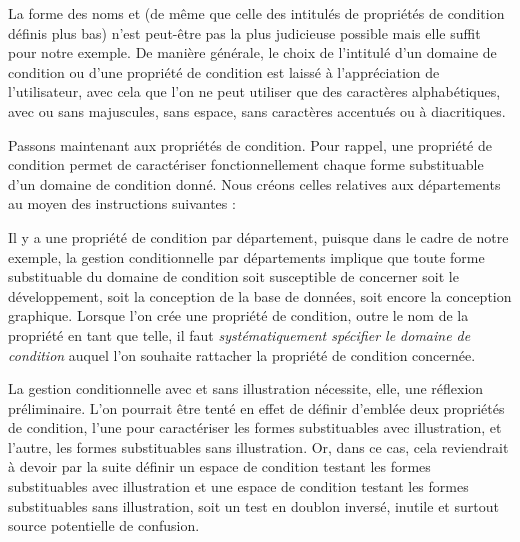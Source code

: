 \documentclass{article}
\begin{document}
\begin{codeblock}
\end{codeblock}

La forme des noms  et  (de même que celle des intitulés de propriétés de condition définis plus bas) n'est peut-être pas la plus judicieuse possible mais elle suffit pour notre exemple. De manière générale, le choix de l'intitulé d'un domaine de condition ou d'une propriété de condition est laissé à l'appréciation de l'utilisateur, avec cela que l'on ne peut utiliser que des caractères alphabétiques, avec ou sans majuscules, sans espace, sans caractères accentués ou à diacritiques.

Passons maintenant aux propriétés de condition. Pour rappel, une propriété de condition permet de caractériser fonctionnellement chaque forme substituable d'un domaine de condition donné. Nous créons celles relatives aux départements au moyen des instructions suivantes :

\begin{codeblock}
\end{codeblock}

\resumepar Il y a une propriété de condition par département, puisque dans le cadre de notre exemple, la gestion conditionnelle par départements implique que toute forme substituable du domaine de condition  soit susceptible de concerner soit le développement, soit la conception de la base de données, soit encore la conception graphique. Lorsque l'on crée une propriété de condition, outre le nom de la propriété en tant que telle, il faut \emph{systématiquement spécifier le domaine de condition} auquel l'on souhaite rattacher la propriété de condition concernée.

La gestion conditionnelle avec et sans illustration nécessite, elle, une réflexion préliminaire. L'on pourrait être tenté en effet de définir d'emblée deux propriétés de condition, l'une pour caractériser les formes substituables avec illustration, et l'autre, les formes substituables sans illustration. Or, dans ce cas, cela reviendrait à devoir par la suite définir un espace de condition testant les formes substituables avec illustration et une espace de condition testant les formes substituables sans illustration, soit un test en doublon inversé, inutile et surtout source potentielle de confusion.
\end{document}
